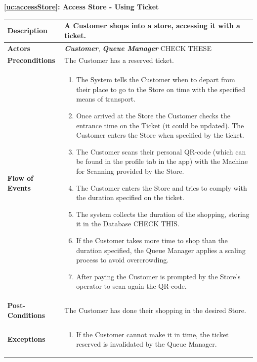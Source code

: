 \documentclass[a4paper, 10pt, oneside]{article}
\newcommand*{\lorenzo}[1]{\textcolor{BurntOrange}{#1}}
\begin{document}
\begin{center}
{\textbf{\ref{uc:accessStore}: Access Store - Using Ticket}}
\end{center}
\begin{tabularx}{\linewidth}{| l | X |}
	
	\hline
	\textbf{Description} & A Customer shops into a store, accessing it with a ticket.\\
	

	\hline
	\textbf{Actors} & \textbf{\textit{Customer}}, \textit{\textbf{Queue Manager}}  \lorenzo{CHECK THESE}\\
	
	\hline
	\textbf{Preconditions} & The Customer has a reserved ticket.\\
	
	\hline
	\textbf{Flow of Events} & \parbox{0.7\textwidth}{	
		\begin{enumerate}
			\item The System tells the Customer when to depart from their place to go to the Store on time with the specified means of transport.
			\item Once arrived at the Store the Customer checks the entrance time on the Ticket (it could be updated). The Customer enters the Store when specified by the ticket.
			\item The Customer scans their personal QR-code (which can be found in the profile tab in the app) with the Machine for Scanning provided by the Store.
			\item The Customer enters the Store and tries to comply with the duration specified on the ticket.
			\item The system collects the duration of the shopping, storing it in the Database \lorenzo{CHECK THIS}.
			\item If the Customer takes more time to shop than the duration specified, the Queue Manager applies a scaling process to avoid overcrowding.
			\item After paying the Customer is prompted by the Store's operator to scan again the QR-code.
	\end{enumerate}}\\
	
	\hline
	\textbf{Post-Conditions} & The Customer has done their shopping in the desired Store.\\
	
	\hline
	\textbf{Exceptions} & \parbox{0.7\textwidth}{ \begin{enumerate}
			\item If the Customer cannot make it in time, the ticket reserved is invalidated by the Queue Manager.
		\end{enumerate}}\\

	\hline
	
\end{tabularx}
\end{document}
